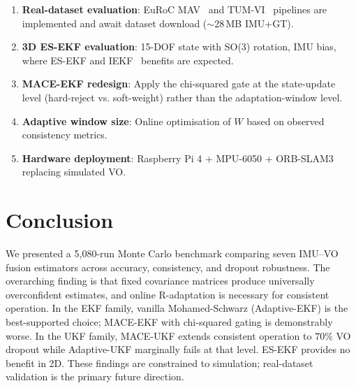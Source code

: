 \documentclass[letterpaper, 10pt, journal]{IEEEtran}
\begin{document}
\begin{enumerate}
\item \textbf{Real-dataset evaluation}: EuRoC MAV~\cite{burri2016euroc}
  and TUM-VI~\cite{schubert2018tumvi} pipelines are implemented
  and await dataset download ($\sim$28\,MB IMU+GT).
\item \textbf{3D ES-EKF evaluation}: 15-DOF state with SO(3) rotation,
  IMU bias, where ES-EKF and IEKF~\cite{huang2008analysis} benefits
  are expected.
\item \textbf{MACE-EKF redesign}: Apply the chi-squared gate at the
  state-update level (hard-reject vs. soft-weight) rather than the
  adaptation-window level.
\item \textbf{Adaptive window size}: Online optimisation of $W$ based
  on observed consistency metrics.
\item \textbf{Hardware deployment}: Raspberry Pi 4 + MPU-6050 +
  ORB-SLAM3~\cite{campos2021orbslam3} replacing simulated VO.
\end{enumerate}

\section{Conclusion}
\label{sec:conclusion}

We presented a 5,080-run Monte Carlo benchmark comparing seven IMU--VO fusion
estimators across accuracy, consistency, and dropout robustness.
The overarching finding is that fixed covariance matrices produce universally
overconfident estimates, and online R-adaptation is necessary for consistent
operation. In the EKF family, vanilla Mohamed-Schwarz (Adaptive-EKF) is the
best-supported choice; MACE-EKF with chi-squared gating is demonstrably
worse. In the UKF family, MACE-UKF extends consistent operation to $70\%$
VO dropout while Adaptive-UKF marginally fails at that level.
ES-EKF provides no benefit in 2D. These findings are constrained to
simulation; real-dataset validation is the primary future direction.



\end{document}
